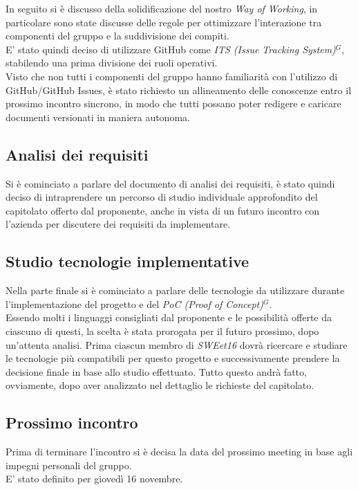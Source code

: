 \documentclass[a4paper, 11pt]{article}
\begin{document}
In seguito si è discusso della solidificazione del nostro \textit{Way of Working}, in particolare sono state discusse delle regole per ottimizzare l'interazione tra componenti del gruppo e la suddivisione dei compiti. \\
E' stato quindi deciso di utilizzare GitHub come \emph{ITS (Issue Tracking System)}$^{G}$, stabilendo una prima divisione dei ruoli operativi. \\
Visto che non tutti i componenti del gruppo hanno familiarità con l'utilizzo di GitHub/GitHub Issues, è stato richiesto un allineamento delle conoscenze entro il prossimo incontro sincrono, in modo che tutti possano poter redigere e caricare documenti versionati in maniera autonoma. 

\subsection{Analisi dei requisiti}
Si è cominciato a parlare del documento di analisi dei requisiti, è stato quindi deciso di intraprendere un percorso di studio individuale approfondito del capitolato offerto dal proponente, anche in vista di un futuro incontro con l'azienda per discutere dei requisiti da implementare.

\subsection{Studio tecnologie implementative}

Nella parte finale si è cominciato a parlare delle tecnologie da utilizzare durante l'implementazione del progetto e del \emph{PoC (Proof of Concept)}$^{G}$. \\
Essendo molti i linguaggi consigliati dal proponente e le possibilità offerte da ciascuno di questi, la scelta è stata prorogata per il futuro prossimo, dopo un'attenta analisi.
Prima ciascun membro di \textit{SWEet16} dovrà ricercare e studiare le tecnologie più compatibili per questo progetto e successivamente prendere la decisione finale in base allo studio effettuato. Tutto questo andrà fatto, ovviamente, dopo aver analizzato nel dettaglio le richieste del capitolato.

\subsection{Prossimo incontro}
Prima di terminare l'incontro si è decisa la data del prossimo meeting in base agli impegni personali del gruppo. \\
E' stato definito per giovedì 16 novembre.
\end{document}
